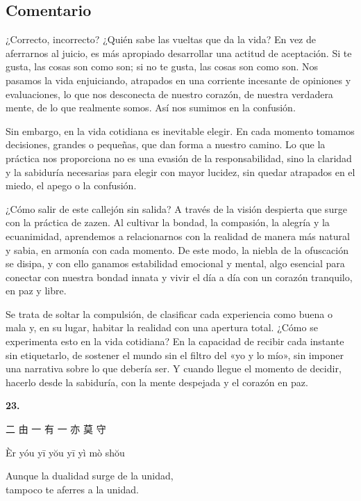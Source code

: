 \documentclass[
  a5paperpaper,
]{article}
\begin{document}
\hfill\break

\hypertarget{comentario-21}{%
\subsection{Comentario}\label{comentario-21}}

¿Correcto, incorrecto? ¿Quién sabe las vueltas que da la vida? En vez de
aferrarnos al juicio, es más apropiado desarrollar una actitud de
aceptación. Si te gusta, las cosas son como son; si no te gusta, las
cosas son como son. Nos pasamos la vida enjuiciando, atrapados en una
corriente incesante de opiniones y evaluaciones, lo que nos desconecta
de nuestro corazón, de nuestra verdadera mente, de lo que realmente
somos. Así nos sumimos en la confusión.

Sin embargo, en la vida cotidiana es inevitable elegir. En cada momento
tomamos decisiones, grandes o pequeñas, que dan forma a nuestro camino.
Lo que la práctica nos proporciona no es una evasión de la
responsabilidad, sino la claridad y la sabiduría necesarias para elegir
con mayor lucidez, sin quedar atrapados en el miedo, el apego o la
confusión.

¿Cómo salir de este callejón sin salida? A través de la visión despierta
que surge con la práctica de zazen. Al cultivar la bondad, la compasión,
la alegría y la ecuanimidad, aprendemos a relacionarnos con la realidad
de manera más natural y sabia, en armonía con cada momento. De este
modo, la niebla de la ofuscación se disipa, y con ello ganamos
estabilidad emocional y mental, algo esencial para conectar con nuestra
bondad innata y vivir el día a día con un corazón tranquilo, en paz y
libre.

Se trata de soltar la compulsión, de clasificar cada experiencia como
buena o mala y, en su lugar, habitar la realidad con una apertura total.
¿Cómo se experimenta esto en la vida cotidiana? En la capacidad de
recibir cada instante sin etiquetarlo, de sostener el mundo sin el
filtro del «yo y lo mío», sin imponer una narrativa sobre lo que debería
ser. Y cuando llegue el momento de decidir, hacerlo desde la sabiduría,
con la mente despejada y el corazón en paz.

\hfill\break

\hypertarget{03}{}
\begin{verseblock}

\newpage

\begin{center}\textbf{23.}\end{center}

二 由 一 有 一 亦 莫 守

Èr yóu yī yŏu yī yì mò shŏu

Aunque la dualidad surge de la unidad,\\
tampoco te aferres a la unidad.

\end{verseblock}
\end{document}
